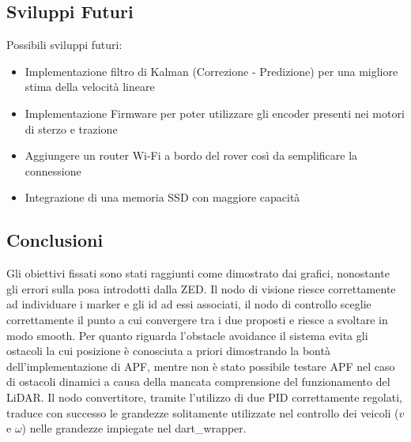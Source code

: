 \label{sec:concl}

\subsection{Sviluppi Futuri}
  Possibili sviluppi futuri: 
  \begin{itemize}
    \item Implementazione filtro di Kalman (Correzione - Predizione) per una migliore stima della velocità lineare
    \item Implementazione Firmware per poter utilizzare gli encoder presenti nei motori di sterzo e trazione
    \item Aggiungere un router Wi-Fi a bordo del rover così da semplificare la connessione
    \item Integrazione di una memoria SSD con maggiore capacità
  \end{itemize}
  
\subsection{Conclusioni}
  Gli obiettivi fissati sono stati raggiunti come dimostrato dai grafici, nonostante gli errori sulla posa introdotti dalla ZED. Il nodo di visione riesce correttamente ad individuare i marker e gli id ad essi associati, il nodo di controllo sceglie correttamente il punto a cui convergere tra i due proposti  e riesce a svoltare in modo smooth.
  Per quanto riguarda l'obstacle avoidance il sistema evita gli ostacoli la cui posizione è conosciuta a priori dimostrando la bontà dell'implementazione di APF, mentre non è stato possibile testare APF nel caso di ostacoli dinamici a causa della mancata comprensione del funzionamento del LiDAR. Il nodo convertitore, tramite l'utilizzo di due PID correttamente regolati, traduce con successo le grandezze solitamente utilizzate nel controllo dei veicoli ($v$ e $\omega$) nelle grandezze impiegate nel dart\_wrapper. 
